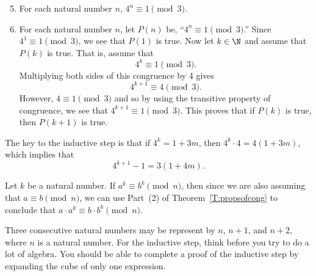 \begin{list}{\bf{\ref{exer:mod3conjecture}.}}
\item \begin{enumerate} \setcounter{enumi}{4}
\item  For each natural number $n$, $4^n \equiv 1 \pmod 3$.

\item For each natural number $n$, let $P(n)$ be, ``$4^n \equiv 1 \pmod 3$.''  Since 
$4^1 \equiv 1 \pmod 3$, we see that $P(1)$ is true.  Now let $k \in \N$ and assume that 
$P(k)$ is true.  That is, assume that
\[
4^k \equiv 1 \pmod 3.
\]
Multiplying both sides of this congruence by 4 gives
\[
4^{k+1} \equiv 4 \pmod 3.
\]
However, $4 \equiv 1 \pmod 3$ and so by using the transitive property of congruence, we see that 
$4^{k+1} \equiv 1 \pmod 3$.  This proves that if $P(k)$ is true, then $P(k+1)$ is true.
\end{enumerate}
\end{list}

\begin{list}{\bf{\ref{exer:sec51-6}.}}
\item \begin{list}{\bf{(a)}}
\item The key to the inductive step is that if $4^k = 1 + 3m$, then 
$4^k \cdot 4 = 4 ( 1 + 3m )$, which implies that
\[
4^{k+1} - 1 = 3 (1 + 4m ).
\]
\end{list}
\end{list}


\begin{list}{\bf{\ref{exer:sec51-cong}.}}
\item Let $k$ be a natural number.  If $a^k \equiv b^k \pmod n$, then since we are also assuming that $a \equiv b \pmod n$, we can use Part~(2) of Theorem~\ref{T:propsofcong} to conclude that 
$a \cdot a^k \equiv b \cdot b^k \pmod n$.
\end{list}

\begin{list}{\bf{\ref{exer:sec51-13}.}}
\item  Three consecutive natural numbers may be represent by $n$, $n + 1$, and $n + 2$, where $n$ is a natural number.  For the inductive step, think before you try to do a lot of algebra.    You should be able to complete a proof of the inductive step by expanding the cube of only one expression. 
\end{list}



\hbreak
\renewcommand{\labelenumi}{\textbf{\arabic{enumi}.}}


\endinput

\begin{list}{\ref{exer:sec51-11}.}
\item For the inductive step, the following trigonometric identities are useful:
\begin{list}{}
\item $\cos ( \alpha + \beta ) = \cos \alpha \cos \beta - \sin \alpha \sin \beta$.
\item $\sin ( \alpha + \beta ) = \sin \alpha \cos \beta + \cos \alpha \sin \beta$.
\end{list}
\end{list}

